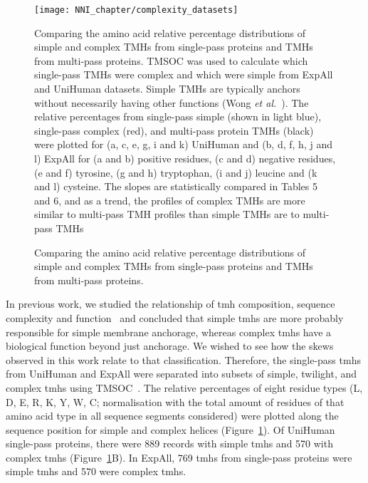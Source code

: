 \begin{figure}[p]
\centering
\texttt{[image: NNI\_chapter/complexity\_datasets]}
\caption{Comparing the amino acid relative percentage distributions of simple and complex TMHs from single-pass proteins and TMHs from multi-pass proteins.}
\medskip
\justify
\small
Comparing the amino acid relative percentage distributions of simple and complex TMHs from single-pass proteins and TMHs from multi-pass proteins. TMSOC was used to calculate which single-pass TMHs were complex and which were simple from ExpAll and UniHuman datasets. Simple TMHs are typically anchors without necessarily having other functions (Wong \textit{et al.}~\cite{Wong2010}). The relative percentages from single-pass simple (shown in light blue), single-pass complex (red), and multi-pass protein TMHs (black) were plotted for (a, c, e, g, i and k) UniHuman and (b, d, f, h, j and l) ExpAll for (a and b) positive residues, (c and d) negative residues, (e and f) tyrosine, (g and h) tryptophan, (i and j) leucine and (k and l) cysteine. The slopes are statistically compared in Tables 5 and 6, and as a trend, the profiles of complex TMHs are more similar to multi-pass TMH profiles than simple TMHs are to multi-pass TMHs
\label{fig:complexity_datasets}
\end{figure}

In previous work, we studied the relationship of \gls{tmh} composition, sequence complexity and function~\cite{Wong2010, Wong2011, Wong2012} and concluded that simple \gls{tmh}s are more probably responsible for simple membrane anchorage, whereas complex \gls{tmh}s have a biological function beyond just anchorage. We wished to see how the skews observed in this work relate to that classification. Therefore, the single-pass \gls{tmh}s from UniHuman and ExpAll were separated into subsets of simple, twilight, and complex \gls{tmh}s using TMSOC~\cite{Wong2011, Wong2012}. The relative percentages of eight residue types (L, D, E, R, K, Y, W, C\@; normalisation with the total amount of residues of that amino acid type in all sequence segments considered) were plotted along the sequence position for simple and complex helices (Figure~\ref{fig:complexity_datasets}). Of UniHuman single-pass proteins, there were 889 records with simple \gls{tmh}s and 570 with complex \gls{tmh}s (Figure~\ref{fig:complexity_datasets}B). In ExpAll, 769 \gls{tmh}s from single-pass proteins were simple \gls{tmh}s and 570 were complex \gls{tmh}s.

